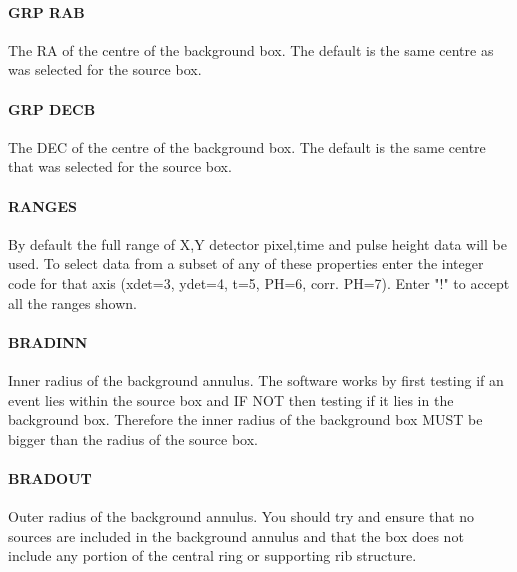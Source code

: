 \documentclass{book}
\renewcommand{\_}{{\tt\char'137}}     %
\begin{document}
\paragraph{GRP RAB}
The RA of the centre of the background box. The default is the same
centre as was selected for the source box.
 
\paragraph{GRP DECB}
The DEC of the centre of the background box. The default is the same
centre that was selected for the source box.
 
\paragraph{RANGES}
By default the full range of X,Y detector pixel,time and pulse height
data will be used.
To select data from a subset of any of these properties enter the integer
code for that axis (xdet=3, ydet=4, t=5, PH=6, corr. PH=7). Enter "!" to
accept all the ranges shown.
 
\paragraph{BRADINN}
Inner radius of the background annulus. The software works by first
testing if an event lies within the source box and IF NOT then testing
if it lies in the background box. Therefore the inner radius of the
background box MUST be bigger than the radius of the source box.
 
\paragraph{BRADOUT}
Outer radius of the background annulus. You should try and ensure that
no sources are included in the background annulus and that the box
does not include any portion of the central ring or supporting rib
structure.
 
\end{document}
